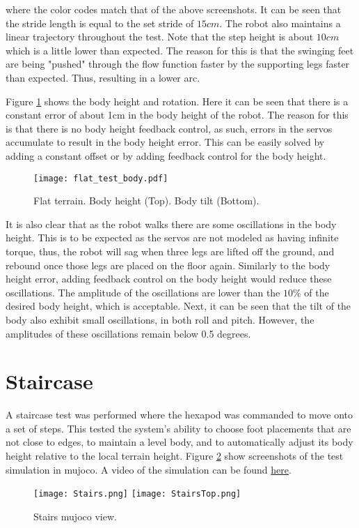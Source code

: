     \noindent
    where the color codes match that of the above screenshots. It can be seen that the stride length is equal to the set stride of \(15cm\). The robot also maintains a linear trajectory throughout the test. Note that the step height is about \(10cm\) which is a little lower than expected. The reason for this is that the swinging feet are being "pushed" through the flow function faster by the supporting legs faster than expected. Thus, resulting in a lower arc.

    Figure \ref{fig:flat_body} shows the body height and rotation. Here it can be seen that there is a constant error of about 1cm in the body height of the robot. The reason for this is that there is no body height feedback control, as such, errors in the servos accumulate to result in the body height error. This can be easily solved by adding a constant offset or by adding feedback control for the body height.
    \begin{figure}[h]
        \centering
        \texttt{[image: flat\_test\_body.pdf]}
        \caption{Flat terrain. Body height (Top). Body tilt (Bottom).}
        \label{fig:flat_body}
    \end{figure}
    It is also clear that as the robot walks there are some oscillations in the body height. This is to be expected as the servos are not modeled as having infinite torque, thus, the robot will sag when three legs are lifted off the ground, and rebound once those legs are placed on the floor again. Similarly to the body height error, adding feedback control on the body height would reduce these oscillations. The amplitude of the oscillations are lower than the \(10\%\) of the desired body height, which is acceptable. Next, it can be seen that the tilt of the body also exhibit small oscillations, in both roll and pitch. However, the amplitudes of these oscillations remain below 0.5 degrees.

    
    \section{Staircase}
    A staircase test was performed where the hexapod was commanded to move onto a set of steps. This tested the system's ability to choose foot placements that are not close to edges, to maintain a level body, and to automatically adjust its body height relative to the local terrain height. Figure \ref{fig:stairs} show screenshots of the test simulation in \ac{mujoco}. A video of the simulation can be found \href{https://youtu.be/6v_fmXEp1Vs}{here}.
    \begin{figure}[h]
        \centering
        \texttt{[image: Stairs.png]}
        \texttt{[image: StairsTop.png]}
        \caption{Stairs \ac{mujoco} view.}
        \label{fig:stairs}
    \end{figure}

